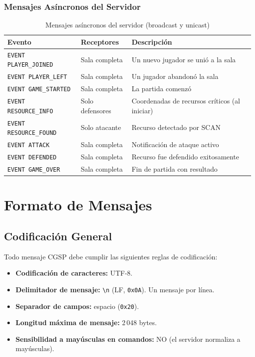 \documentclass[12pt, letterpaper]{article}
\begin{document}
\subsubsection{Mensajes Asíncronos del Servidor}

\begin{table}[H]
\centering
\begin{tabularx}{\textwidth}{l l X}
\toprule
\textbf{Evento} & \textbf{Receptores} & \textbf{Descripción} \\
\midrule
\texttt{EVENT PLAYER\_JOINED}  & Sala completa    & Un nuevo jugador se unió a la sala \\
\texttt{EVENT PLAYER\_LEFT}    & Sala completa    & Un jugador abandonó la sala \\
\texttt{EVENT GAME\_STARTED}   & Sala completa    & La partida comenzó \\
\texttt{EVENT RESOURCE\_INFO}  & Solo defensores  & Coordenadas de recursos críticos (al iniciar) \\
\texttt{EVENT RESOURCE\_FOUND} & Solo atacante    & Recurso detectado por SCAN \\
\texttt{EVENT ATTACK}          & Sala completa    & Notificación de ataque activo \\
\texttt{EVENT DEFENDED}        & Sala completa    & Recurso fue defendido exitosamente \\
\texttt{EVENT GAME\_OVER}      & Sala completa    & Fin de partida con resultado \\
\bottomrule
\end{tabularx}
\caption{Mensajes asíncronos del servidor (broadcast y unicast)}
\end{table}

\section{Formato de Mensajes}

\subsection{Codificación General}

Todo mensaje CGSP debe cumplir las siguientes reglas de codificación:

\begin{itemize}[leftmargin=2em]
    \item \textbf{Codificación de caracteres:} UTF-8.
    \item \textbf{Delimitador de mensaje:} \texttt{\textbackslash{}n} (LF, \texttt{0x0A}). Un mensaje por línea.
    \item \textbf{Separador de campos:} espacio (\texttt{0x20}).
    \item \textbf{Longitud máxima de mensaje:} 2\,048 bytes.
    \item \textbf{Sensibilidad a mayúsculas en comandos:} NO (el servidor normaliza a mayúsculas).
\end{itemize}
\end{document}
